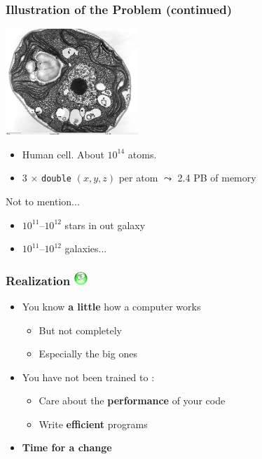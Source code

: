\documentclass[xcolor={x11names,svgnames,psnames}]{beamer}
\newcommand{\triste}{\includegraphics[width=0.5cm,trim=0 17mm 0 0]{triste}}
\newcommand{\red}{\alert}
\begin{document}

\begin{frame}
\frametitle{Illustration of the Problem (continued)}

\begin{center}
\includegraphics[width=5cm]{cell.jpg}
\end{center}

\begin{itemize}
\item Human cell. About $10^{14}$ atoms.
\item 3 $\times$ \texttt{double} $(x, y, z)$ per atom $\leadsto$ 2.4 PB of memory
\end{itemize}

\medskip

\begin{alertblock}{Not to mention...}
  \begin{itemize}
  \item $10^{11}$--$10^{12}$ stars in out galaxy
  \item $10^{11}$--$10^{12}$ galaxies...
  \end{itemize}
\end{alertblock}

\end{frame}



\begin{frame}
  \frametitle{Realization \triste}

  \begin{itemize}
  \item You know \textbf{a little} how a computer works
    \begin{itemize}
    \item But \red{not completely}
    \item Especially the big ones
    \end{itemize}

    \medskip
    
  \item You have not been trained to :
    \begin{itemize}
    \item \red{Care} about the \textbf{performance} of your code
    \item Write \textbf{efficient} programs
    \end{itemize}
    
    \pause
    \bigskip

    \item \Huge \textbf{Time for a change}
    \end{itemize}

\end{frame}
\end{document}

